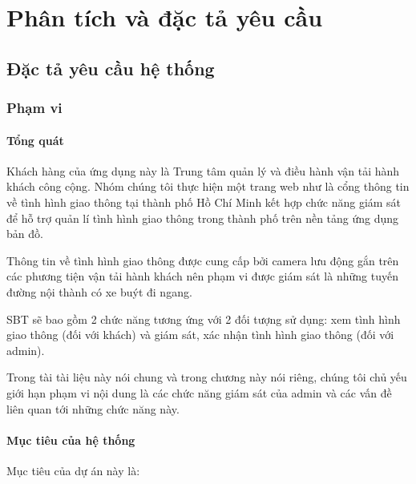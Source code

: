 \chapter{Phân tích và đặc tả yêu cầu}

\section{Đặc tả yêu cầu hệ thống}
\subsection{Phạm vi}
\subsubsection{Tổng quát}
Khách hàng của ứng dụng này là Trung tâm quản lý và điều hành vận tải hành khách công cộng. Nhóm chúng tôi thực hiện một trang web như là cổng thông tin về tình hình giao thông tại thành phố Hồ Chí Minh kết hợp chức năng giám sát để hỗ trợ quản lí tình hình giao thông trong thành phố trên nền tảng ứng dụng bản đồ.

Thông tin về tình hình giao thông được cung cấp bởi camera lưu động gắn trên các phương tiện vận tải hành khách nên phạm vi được giám sát là những tuyến đường nội thành có xe buýt đi ngang.

SBT sẽ bao gồm 2 chức năng tương ứng với 2 đối tượng sử dụng: xem tình hình giao thông (đối với khách) và giám sát, xác nhận tình hình giao thông (đối với admin).

Trong tài tài liệu này nói chung và trong chương này nói riêng, chúng tôi chủ yếu giới hạn phạm vi nội dung là các chức năng giám sát của admin và các vấn đề liên quan tới những chức năng này.

\subsubsection{Mục tiêu của hệ thống}
Mục tiêu của dự án này là:

